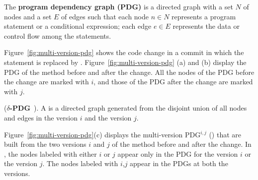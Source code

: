 \begin{Definition}
The \textbf{program dependency graph (PDG)} is a directed graph with
a set $N$ of nodes and a set $E$ of edges such that each node $n \in N$
represents a program statement or a conditional expression; each edge
$e \in E$ represents the data or control flow among the statements.
\end{Definition}

Figure~\ref{fig:multi-version-pdg} shows the code change in a commit
in which the statement  is replaced by
. Figure~\ref{fig:multi-version-pdg} (a) and
(b) display the PDG of the method  before and after
the change. All the nodes of the PDG before the change are marked with
$i$, and those of the PDG after the change are marked with $j$.


\begin{Definition} ({\bf $\delta$-PDG}~\cite{flexeme-fse20}).
A {\mvpdg} is a directed graph generated from the disjoint
union of all nodes and edges in the version $i$ and the version $j$.
%
\end{Definition}

Figure~\ref{fig:multi-version-pdg}(c) displays the multi-version
PDG$^{i,j}$ ({\mvpdg}) that are built from the two
versions $i$ and $j$ of the method  before and after
the change. In {\mvpdg}, the nodes labeled with either $i$
or $j$ appear only in the PDG for the version $i$ or the version $j$.
The nodes labeled with $i$,$j$ appear in the PDGs at both the
versions.


